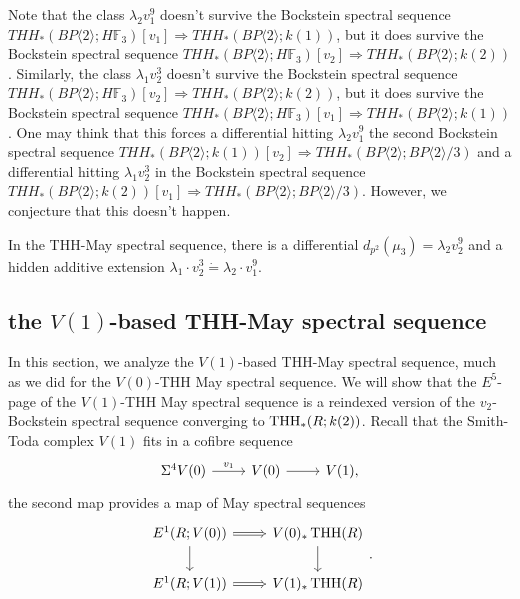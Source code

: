 Note that the class $\lambda_2v_1^9$ doesn't survive the Bockstein spectral sequence $THH_*(BP\langle 2\rangle ; H\mathbb{F}_3)[v_1]\Rightarrow THH_*(BP\langle 2\rangle ; k(1))$, but it does survive the Bockstein spectral sequence $THH_*(BP\langle 2\rangle ; H\mathbb{F}_3)[v_2]\Rightarrow THH_*(BP\langle 2\rangle ; k(2))$. Similarly, the class $\lambda_1 v_2^3$ doesn't survive the Bockstein spectral sequence $THH_*(BP\langle 2\rangle ; H\mathbb{F}_3)[v_2]\Rightarrow THH_*(BP\langle 2\rangle ; k(2))$, but it does survive the Bockstein spectral sequence $THH_*(BP\langle 2\rangle ; H\mathbb{F}_3)[v_1]\Rightarrow THH_*(BP\langle 2\rangle ; k(1))$. One may think that this forces a differential hitting $\lambda_2v_1^9$ the second Bockstein spectral sequence $THH_*(BP\langle 2\rangle ; k(1))[v_2]\Rightarrow THH_*(BP\langle 2\rangle ; BP\langle 2\rangle /3 )$ and a differential hitting $\lambda_1 v_2^3$ in the Bockstein spectral sequence $THH_*(BP\langle 2\rangle ; k(2))[v_1]\Rightarrow THH_*(BP\langle 2\rangle ;BP\langle 2\rangle/3 )$. However, we conjecture that this doesn't happen.
\begin{conjecture}
In the THH-May spectral sequence, there is a differential $d_{p^2}(\mu_3)=\lambda_2v_2^9$ and a hidden additive extension $\lambda_1 \cdot v_2^3\dot{=}\lambda_2 \cdot v_1^9$. 
\end{conjecture}

\subsection{the $V(1)$-based THH-May spectral sequence}

In this section, we analyze the $V(1)$-based THH-May spectral sequence, much as we did for the $V(0)$-THH May spectral sequence. We will show that the $E^5$-page of the $V(1)$-THH May spectral sequence is a reindexed version of the $v_2$-Bockstein spectral sequence converging to $\operatorname{THH}_*(R;k(2))$. Recall that the Smith-Toda complex $V(1)$ fits in a cofibre sequence
\[
\begin{tikzcd}
	\Sigma^4V(0)\arrow[r, "v_1"] & V(0)\arrow[r] & V(1),
\end{tikzcd}
\]
the second map provides a map of May spectral sequences
\[
\begin{tikzcd}
	E^1(R;V(0))\arrow[r, Rightarrow]\arrow[d]& V(0)_*\THH(R)\arrow[d]\\
	E^1(R;V(1))\arrow[r, Rightarrow] & V(1)_*\THH(R)
\end{tikzcd}.
\]

